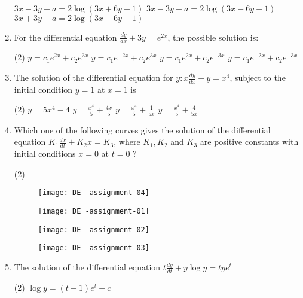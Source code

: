 \begin{enumerate}
\begin{tasks}
		\task[\textbf{b.}] $3 x-3 y+a=2 \log (3 x+6 y-1)$
		\task[\textbf{c.}]$3 x-3 y+a=2 \log (3 x-6 y-1)$
		\task[\textbf{d.}] $3 x+3 y+a=2 \log (3 x-6 y-1)$
	\end{tasks}
	\item For the differential equation $\frac{d y}{d x}+3 y=e^{2 x}$, the possible solution is:
	 \begin{tasks}(2)
		\task[\textbf{a.}]$y=c_{1} e^{2 x}+c_{2} e^{3 x}$
		\task[\textbf{b.}]$y=c_{1} e^{-2 x}+c_{2} e^{3 x}$
		\task[\textbf{c.}]$y=c_{1} e^{2 x}+c_{2} e^{-3 x}$
		\task[\textbf{d.}] $y=c_{1} e^{-2 x}+c_{2} e^{-3 x}$
	\end{tasks}
	\item The solution of the differential equation for $y: x \frac{d y}{d x}+y=x^{4}$, subject to the initial condition $y=1$ at $x=1$ is
	 \begin{tasks}(2)
		\task[\textbf{a.}]$y=5 x^{4}-4$
		\task[\textbf{b.}]$y=\frac{x^{4}}{5}+\frac{4 x}{5}$
		\task[\textbf{c.}] $y=\frac{x^{4}}{5}+\frac{1}{5 x}$
		\task[\textbf{d.}] $y=\frac{x^{4}}{5}+\frac{4}{5 x}$
	\end{tasks}
	\item Which one of the following curves gives the solution of the differential equation $K_{1} \frac{d x}{d t}+K_{2} x=K_{3}$, where $K_{1}, K_{2}$ and $K_{3}$ are positive constants with initial conditions $x=0$ at $t=0$ ?
	 \begin{tasks}(2)
		\task[\textbf{a.}]
		\begin{figure}[H]
			\centering
			\texttt{[image: DE -assignment-04]}
		\end{figure}
		\task[\textbf{b.}]	
		\begin{figure}[H]
			\centering
			\texttt{[image: DE -assignment-01]}
		\end{figure}
		\task[\textbf{c.}]
			\begin{figure}[H]
			\centering
			\texttt{[image: DE -assignment-02]}
		\end{figure}
		\task[\textbf{d.}]
			\begin{figure}[H]
			\centering
			\texttt{[image: DE -assignment-03]}
		\end{figure}
	\end{tasks}
	\item The solution of the differential equation $t \frac{d y}{d t}+y \log y=t y e^{t}$
	 \begin{tasks}(2)
		\task[\textbf{a.}]$\log y=(t+1) e^{t}+c$

\end{tasks}
\end{enumerate}
